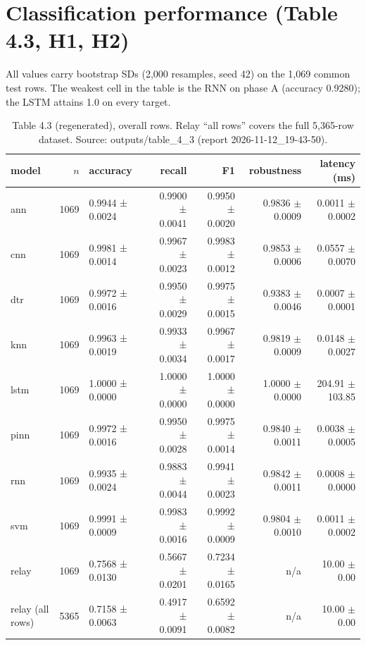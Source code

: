 \documentclass[11pt,a4paper]{article}
\begin{document}
\section{Classification performance (Table 4.3, H1, H2)}

All values carry bootstrap SDs (2{,}000 resamples, seed 42) on the
1{,}069 common test rows. The weakest cell in the table is the RNN on
phase A (accuracy 0.9280); the LSTM attains 1.0 on every target.

\begin{table}[H]
\centering
\footnotesize
\setlength{\tabcolsep}{3.5pt}
\begin{tabular}{@{}lrlrrrr@{}}
\toprule
model & $n$ & accuracy & recall & F1 & robustness & latency (ms) \\
\midrule
ann & 1069 & 0.9944 ± 0.0024 & 0.9900 ± 0.0041 & 0.9950 ± 0.0020 & 0.9836 $\pm$ 0.0009 & 0.0011 $\pm$ 0.0002 \\
cnn & 1069 & 0.9981 ± 0.0014 & 0.9967 ± 0.0023 & 0.9983 ± 0.0012 & 0.9853 $\pm$ 0.0006 & 0.0557 $\pm$ 0.0070 \\
dtr & 1069 & 0.9972 ± 0.0016 & 0.9950 ± 0.0029 & 0.9975 ± 0.0015 & 0.9383 $\pm$ 0.0046 & 0.0007 $\pm$ 0.0001 \\
knn & 1069 & 0.9963 ± 0.0019 & 0.9933 ± 0.0034 & 0.9967 ± 0.0017 & 0.9819 $\pm$ 0.0009 & 0.0148 $\pm$ 0.0027 \\
lstm & 1069 & 1.0000 ± 0.0000 & 1.0000 ± 0.0000 & 1.0000 ± 0.0000 & 1.0000 $\pm$ 0.0000 & 204.91 $\pm$ 103.85 \\
pinn & 1069 & 0.9972 ± 0.0016 & 0.9950 ± 0.0028 & 0.9975 ± 0.0014 & 0.9840 $\pm$ 0.0011 & 0.0038 $\pm$ 0.0005 \\
rnn & 1069 & 0.9935 ± 0.0024 & 0.9883 ± 0.0044 & 0.9941 ± 0.0023 & 0.9842 $\pm$ 0.0011 & 0.0008 $\pm$ 0.0000 \\
svm & 1069 & 0.9991 ± 0.0009 & 0.9983 ± 0.0016 & 0.9992 ± 0.0009 & 0.9804 $\pm$ 0.0010 & 0.0011 $\pm$ 0.0002 \\
relay & 1069 & 0.7568 ± 0.0130 & 0.5667 ± 0.0201 & 0.7234 ± 0.0165 & n/a & 10.00 $\pm$ 0.00 \\
relay (all rows) & 5365 & 0.7158 ± 0.0063 & 0.4917 ± 0.0091 & 0.6592 ± 0.0082 & n/a & 10.00 $\pm$ 0.00 \\
\bottomrule
\end{tabular}
\caption{Table 4.3 (regenerated), overall rows. Relay ``all rows''
covers the full 5{,}365-row dataset. Source: outputs/table\_4\_3
(report 2026-11-12\_19-43-50).}
\end{table}
\end{document}
